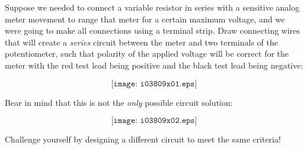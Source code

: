 

Suppose we needed to connect a variable resistor in series with a sensitive analog meter movement to range that meter for a certain maximum voltage, and we were going to make all connections using a terminal strip.  Draw connecting wires that will create a {\it series} circuit between the meter and two terminals of the potentiometer, such that polarity of the applied voltage will be correct for the meter with the red test lead being positive and the black test lead being negative:

$$\texttt{[image: i03809x01.eps]}$$







Bear in mind that this is not the {\it only} possible circuit solution:

$$\texttt{[image: i03809x02.eps]}$$

Challenge yourself by designing a different circuit to meet the same criteria! 










